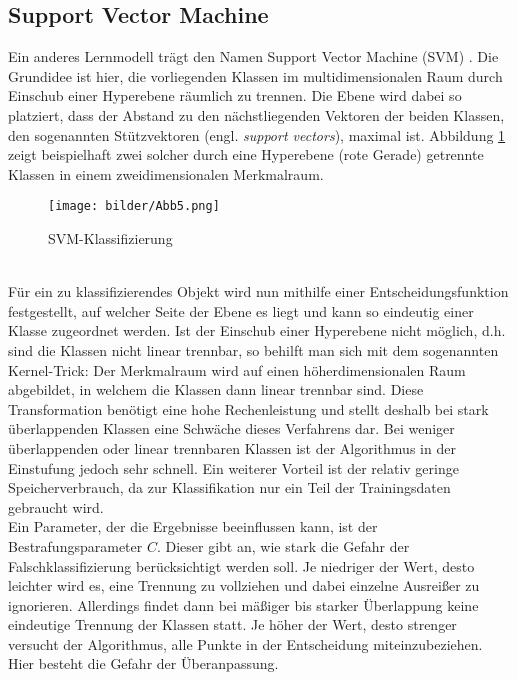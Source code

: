 \subsection{Support Vector Machine}\label{svm}
Ein anderes Lernmodell trägt den Namen Support Vector Machine (SVM) \citep{Nayak15}. Die Grundidee ist hier, die vorliegenden Klassen im multidimensionalen Raum durch Einschub einer Hyperebene räumlich zu trennen. Die Ebene wird dabei so platziert, dass der Abstand zu den nächstliegenden Vektoren der beiden Klassen, den sogenannten Stützvektoren (engl. \textit{support vectors}), maximal ist. Abbildung \ref{svm-alg} zeigt beispielhaft zwei solcher durch eine Hyperebene (rote Gerade) getrennte Klassen in einem zweidimensionalen Merkmalraum. 
\begin{figure}[htb]
	\begin{center}
		\texttt{[image: bilder/Abb5.png]}
		\caption{SVM-Klassifizierung \citep{Zhou16}}\label{svm-alg}
	\end{center}
\end{figure}\\
 Für ein zu klassifizierendes Objekt wird nun mithilfe einer Entscheidungsfunktion festgestellt, auf welcher Seite der Ebene es liegt und kann so eindeutig einer Klasse zugeordnet werden. Ist der Einschub einer Hyperebene nicht möglich, d.h. sind die Klassen nicht linear trennbar, so behilft man sich mit dem sogenannten \glqq Kernel-Trick\grqq{}: Der Merkmalraum wird auf einen höherdimensionalen Raum abgebildet, in welchem die Klassen dann linear trennbar sind. Diese Transformation benötigt eine hohe Rechenleistung und stellt deshalb bei stark überlappenden Klassen eine Schwäche dieses Verfahrens dar. Bei weniger überlappenden oder linear trennbaren Klassen ist der Algorithmus in der Einstufung jedoch sehr schnell. Ein weiterer Vorteil ist der relativ geringe Speicherverbrauch, da zur Klassifikation nur ein Teil der Trainingsdaten gebraucht wird.\\
 Ein Parameter, der die Ergebnisse beeinflussen kann, ist der Bestrafungsparameter $C$. Dieser gibt an, wie stark die Gefahr der Falschklassifizierung berücksichtigt werden soll. Je niedriger der Wert, desto leichter wird es, eine Trennung zu vollziehen und dabei einzelne Ausreißer zu ignorieren. Allerdings findet dann bei mäßiger bis starker Überlappung keine eindeutige Trennung der Klassen statt. Je höher der Wert, desto strenger versucht der Algorithmus, alle Punkte in der Entscheidung miteinzubeziehen. Hier besteht die Gefahr der Überanpassung.
